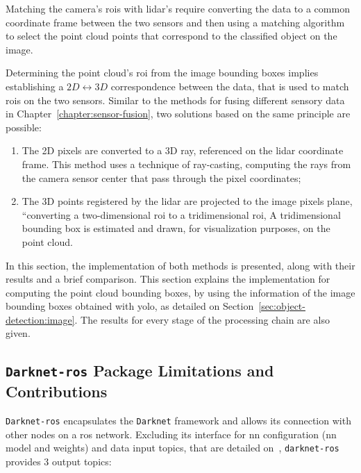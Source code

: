 Matching the camera's \acp{roi} with \ac{lidar}'s require converting the data to a common coordinate frame between the two sensors and then using a matching algorithm to select the point cloud points that correspond to the classified object on the image.

Determining the point cloud's \ac{roi} from the image bounding boxes implies establishing a $2D \leftrightarrow 3D$ correspondence between the data, that is used to match \acp{roi} on the two sensors. Similar to the methods for fusing different sensory data in Chapter~\ref{chapter:sensor-fusion}, two solutions based on the same principle are possible:

\begin{enumerate}
	\item The 2D pixels are converted to a 3D ray, referenced on the \ac{lidar} coordinate frame. This method uses a technique of ray-casting, computing the rays from the camera sensor center that pass through the pixel coordinates;
	\item The 3D points registered by the \ac{lidar} are projected to the image pixels plane, ``converting a two-dimensional \ac{roi} to a tridimensional \ac{roi}, A tridimensional bounding box is estimated and drawn, for visualization purposes, on the point cloud. 
\end{enumerate}

In this section, the implementation of both methods is presented, along with their results and a brief comparison. This section explains the implementation for computing the point cloud bounding boxes, by using the information of the image bounding boxes obtained with \ac{yolo}, as detailed on Section~\ref{sec:object-detection:image}. The results for every stage of the processing chain are also given.


\subsection{\texttt{Darknet-ros} Package Limitations and Contributions}
\label{subsec:object-detection:darknet-contribution}
\texttt{Darknet-ros} encapsulates the \texttt{Darknet} framework and allows its connection with other nodes on a \ac{ros} network. Excluding its interface for \ac{nn} configuration (\ac{nn} model and weights) and data input topics, that are detailed on~\cite{MarkoBjelonic}, \texttt{darknet-ros} provides 3 output topics:

